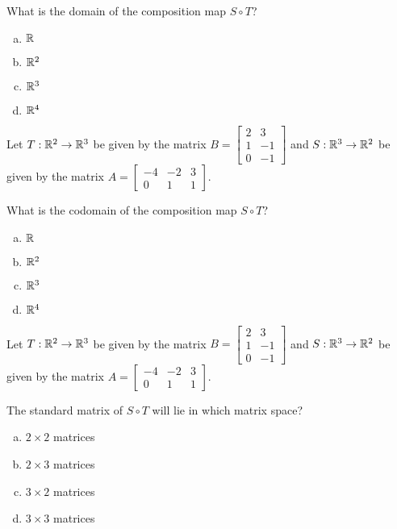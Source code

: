 \begin{applicationActivities}{1}{21}
\begin{activity}{2}
What is the domain of the composition map $S \circ T$?
\begin{enumerate}[(a)]
\item $\mathbb{R}$
\item $\mathbb{R}^2$
\item $\mathbb{R}^3$
\item $\mathbb{R}^4$
\end{enumerate}
\end{activity}

\begin{activity}{2}
Let $T: \mathbb{R}^2 \rightarrow \mathbb{R}^3$ be given by the matrix $B=\begin{bmatrix} 2 & 3 \\ 1 & -1 \\ 0 & -1 \end{bmatrix}$ and $S: \mathbb{R}^3 \rightarrow \mathbb{R}^2$ be given by the matrix $A=\begin{bmatrix} -4 & -2 & 3 \\ 0 & 1 & 1 \end{bmatrix}$.

What is the codomain of the composition map $S \circ T$?
\begin{enumerate}[(a)]
\item $\mathbb{R}$
\item $\mathbb{R}^2$
\item $\mathbb{R}^3$
\item $\mathbb{R}^4$
\end{enumerate}
\end{activity}

\begin{activity}{2}
Let $T: \mathbb{R}^2 \rightarrow \mathbb{R}^3$ be given by the matrix $B=\begin{bmatrix} 2 & 3 \\ 1 & -1 \\ 0 & -1 \end{bmatrix}$ and $S: \mathbb{R}^3 \rightarrow \mathbb{R}^2$ be given by the matrix $A=\begin{bmatrix} -4 & -2 & 3 \\ 0 & 1 & 1 \end{bmatrix}$.

The standard matrix of $S \circ T$ will lie in which matrix space?
\begin{enumerate}[(a)]
\item $2 \times 2$ matrices
\item $2 \times 3$ matrices
\item $3 \times 2$ matrices
\item $3 \times 3$ matrices
\end{enumerate}
\end{activity}


\end{applicationActivities}
